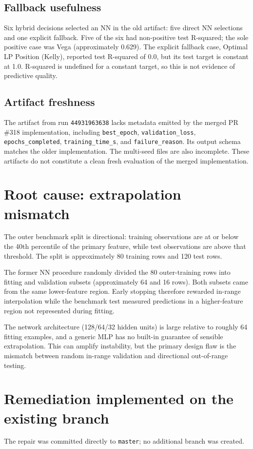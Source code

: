 \documentclass[11pt,a4paper]{article}
\begin{document}
\subsection{Fallback usefulness}
Six hybrid decisions selected an NN in the old artifact: five direct NN selections and one explicit fallback. Five of the six had non-positive test R-squared; the sole positive case was Vega (approximately 0.629). The explicit fallback case, Optimal LP Position (Kelly), reported test R-squared of 0.0, but its test target is constant at 1.0. R-squared is undefined for a constant target, so this is not evidence of predictive quality.

\subsection{Artifact freshness}
The artifact from run \texttt{44931963638} lacks metadata emitted by the merged PR \#318 implementation, including \texttt{best\_epoch}, \texttt{validation\_loss}, \texttt{epochs\_completed}, \texttt{training\_time\_s}, and \texttt{failure\_reason}. Its output schema matches the older implementation. The multi-seed files are also incomplete. These artifacts do not constitute a clean fresh evaluation of the merged implementation.

\section{Root cause: extrapolation mismatch}
The outer benchmark split is directional: training observations are at or below the 40th percentile of the primary feature, while test observations are above that threshold. The split is approximately 80 training rows and 120 test rows.

The former NN procedure randomly divided the 80 outer-training rows into fitting and validation subsets (approximately 64 and 16 rows). Both subsets came from the same lower-feature region. Early stopping therefore rewarded in-range interpolation while the benchmark test measured predictions in a higher-feature region not represented during fitting.

The network architecture (128/64/32 hidden units) is large relative to roughly 64 fitting examples, and a generic MLP has no built-in guarantee of sensible extrapolation. This can amplify instability, but the primary design flaw is the mismatch between random in-range validation and directional out-of-range testing.

\section{Remediation implemented on the existing branch}
The repair was committed directly to \texttt{master}; no additional branch was created.
\end{document}
